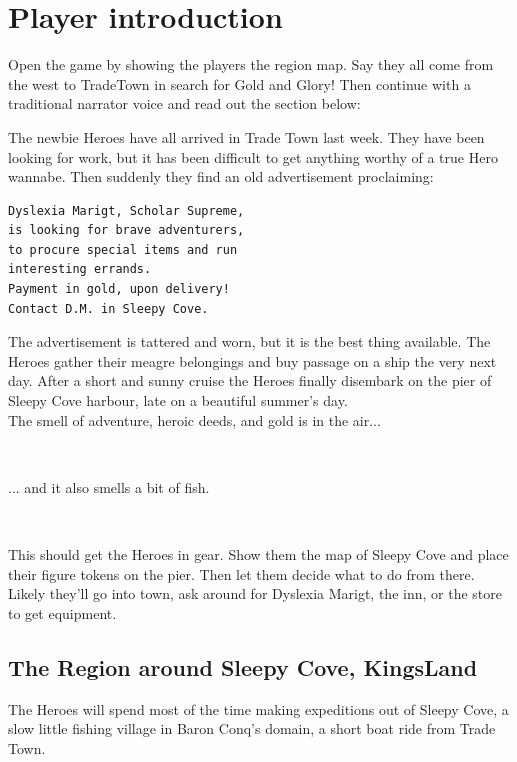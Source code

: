 

\clearpage
{}
\section*{Player introduction}

Open the game by showing the players the region map. Say they all come from the west to TradeTown in search for Gold and Glory! Then continue with a traditional narrator voice and read out the section below:

\begin{readoutloud}
The newbie Heroes have all arrived in Trade Town last week. They have been looking for work, but it has been difficult to get anything worthy of a true Hero wannabe.
Then suddenly they find an old advertisement proclaiming:

\begin{center} \begin{verbatim}
Dyslexia Marigt, Scholar Supreme,
is looking for brave adventurers,
to procure special items and run
interesting errands.
Payment in gold, upon delivery!
Contact D.M. in Sleepy Cove.
\end{verbatim} \end{center}

The advertisement is tattered and worn, but it is the best thing available. The Heroes gather their meagre belongings and buy passage on a ship the very next day. After a short and sunny cruise the Heroes finally disembark on the pier of Sleepy Cove harbour, late on a beautiful summer's day.\\
The smell of adventure, heroic deeds, and gold is in the air...

\

... and it also smells a bit of fish.
\end{readoutloud}

\

This should get the Heroes in gear. Show them the map of Sleepy Cove and place their figure tokens on the pier. Then let them decide what to do from there. Likely they'll go into town, ask around for Dyslexia Marigt, the inn, or the store to get equipment.




\clearpage
\subsection*{The Region around Sleepy Cove, KingsLand}
The Heroes will spend most of the time making expeditions out of Sleepy Cove, a slow little fishing village in Baron Conq's domain, a short boat ride from Trade Town.

